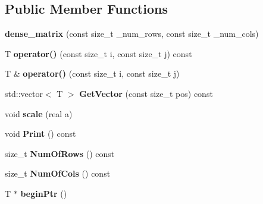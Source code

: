 \subsection*{Public Member Functions}
\begin{DoxyCompactItemize}
\item 
{\bfseries dense\+\_\+matrix} (const size\+\_\+t \+\_\+num\+\_\+rows, const size\+\_\+t \+\_\+num\+\_\+cols)\hypertarget{classkpm_1_1dense__matrix_ab23c8d939aff1e758b41ab0ffa685d67}{}\label{classkpm_1_1dense__matrix_ab23c8d939aff1e758b41ab0ffa685d67}

\item 
T {\bfseries operator()} (const size\+\_\+t i, const size\+\_\+t j) const \hypertarget{classkpm_1_1dense__matrix_a90cba48bc8fc42ef7013686fb27fbd3a}{}\label{classkpm_1_1dense__matrix_a90cba48bc8fc42ef7013686fb27fbd3a}

\item 
T \& {\bfseries operator()} (const size\+\_\+t i, const size\+\_\+t j)\hypertarget{classkpm_1_1dense__matrix_a6b0525aa1a6da9044ad7194c436faa6e}{}\label{classkpm_1_1dense__matrix_a6b0525aa1a6da9044ad7194c436faa6e}

\item 
std\+::vector$<$ T $>$ {\bfseries Get\+Vector} (const size\+\_\+t pos) const \hypertarget{classkpm_1_1dense__matrix_a3dd4e617836c5d00445e870ddf236260}{}\label{classkpm_1_1dense__matrix_a3dd4e617836c5d00445e870ddf236260}

\item 
void {\bfseries scale} (real a)\hypertarget{classkpm_1_1dense__matrix_a7a35a69d79fbdd286001bf91b698afa8}{}\label{classkpm_1_1dense__matrix_a7a35a69d79fbdd286001bf91b698afa8}

\item 
void {\bfseries Print} () const \hypertarget{classkpm_1_1dense__matrix_a6240dcab8877d8de3cee23a0d8ba4bad}{}\label{classkpm_1_1dense__matrix_a6240dcab8877d8de3cee23a0d8ba4bad}

\item 
size\+\_\+t {\bfseries Num\+Of\+Rows} () const \hypertarget{classkpm_1_1dense__matrix_a89a1cbb2b84288c3c14b5b577ae5f0f3}{}\label{classkpm_1_1dense__matrix_a89a1cbb2b84288c3c14b5b577ae5f0f3}

\item 
size\+\_\+t {\bfseries Num\+Of\+Cols} () const \hypertarget{classkpm_1_1dense__matrix_a5c03108ababa8390b4dd1e7e9f49ca76}{}\label{classkpm_1_1dense__matrix_a5c03108ababa8390b4dd1e7e9f49ca76}

\item 
T $\ast$ {\bfseries begin\+Ptr} ()\hypertarget{classkpm_1_1dense__matrix_a96f539b0c3966659941067b93203ca70}{}\label{classkpm_1_1dense__matrix_a96f539b0c3966659941067b93203ca70}


\end{DoxyCompactItemize}
